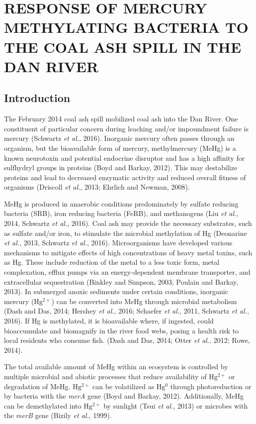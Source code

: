 \documentclass[ms, hidelinks]{uncgdissertationexp}
\theoremstyle{plain}
\theoremstyle{definition}
\theoremstyle{remark}
\begin{document}
\hypertarget{pcr}{%
\chapter{RESPONSE OF MERCURY METHYLATING BACTERIA TO THE COAL ASH SPILL IN THE DAN RIVER}\label{pcr}}

\hypertarget{introduction}{%
\section{Introduction}\label{introduction}}

The February 2014 coal ash spill mobilized coal ash into the Dan River. One constituent of particular concern during leaching and/or impoundment failure is mercury (Schwartz \emph{et al.}, 2016). Inorganic mercury often passes through an organism, but the bioavailable form of mercury, methylmercury (MeHg) is a known neurotoxin and potential endocrine disruptor and has a high affinity for sulfhydryl groups in proteins (Boyd and Barkay, 2012). This may destabilize proteins and lead to decreased enzymatic activity and reduced overall fitness of organisms (Driscoll \emph{et al.}, 2013; Ehrlich and Newman, 2008).

MeHg is produced in anaerobic conditions predominately by sulfate reducing bacteria (SRB), iron reducing bacteria (FeRB), and methanogens (Liu \emph{et al.}, 2014, Schwartz \emph{et al.}, 2016). Coal ash may provide the necessary substrates, such as sulfate and/or iron, to stimulate the microbial methylation of Hg (Deonarine \emph{et al.}, 2013, Schwartz \emph{et al.}, 2016). Microorganisms have developed various mechanisms to mitigate effects of high concentrations of heavy metal toxins, such as Hg. These include reduction of the metal to a less toxic form, metal complexation, efflux pumps via an energy-dependent membrane transporter, and extracellular sequestration (Binkley and Simpson, 2003; Poulain and Barkay, 2013).
In submerged anoxic sediments under certain conditions, inorganic mercury (\(\mathrm{Hg^{2+}}\)) can be converted into MeHg through microbial metabolism (Dash and Das, 2014; Hershey \emph{et al.}, 2016; Schaefer \emph{et al.}, 2011, Schwartz \emph{et al.}, 2016). If Hg is methylated, it is bioavailable where, if ingested, could bioaccumulate and biomagnify in the river food webs, posing a health risk to local residents who consume fish. (Dash and Das, 2014; Otter \emph{et al.}, 2012; Rowe, 2014).

The total available amount of MeHg within an ecosystem is controlled by multiple microbial and abiotic processes that reduce availability of \(\mathrm{Hg^{2+}}\) or degradation of MeHg. \(\mathrm{Hg^{2+}}\) can be volatilized as \(\mathrm{Hg^{0}}\) through photoreduction or by bacteria with the \emph{merA} gene (Boyd and Barkay, 2012). Additionally, MeHg can be demethylated into \(\mathrm{Hg^{2+}}\) by sunlight (Tsui \emph{et al.}, 2013) or microbes with the \emph{merB} gene (Bizily \emph{et al.}, 1999).
\end{document}
